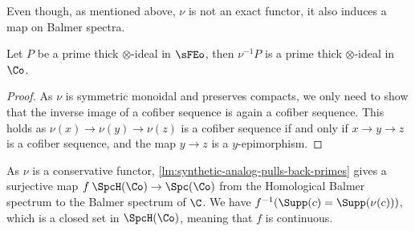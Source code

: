 Even though, as mentioned above, $\nu$ is not an exact functor, it also induces a map on Balmer spectra. 

\begin{lemma}
    \label{lm:synthetic-analog-pulls-back-primes}
    Let $P$ be a prime thick $\otimes$-ideal in $\sFEo$, then $\nu^{-1}P$ is a prime thick $\otimes$-ideal in $\Co$. 
\end{lemma}
\begin{proof}
    As $\nu$ is symmetric monoidal and preserves compacts, we only need to show that the inverse image of a cofiber sequence is again a cofiber sequence. This holds as $\nu (x)\rightarrow \nu (y)\rightarrow \nu (z)$ is a cofiber sequence if and only if $x\rightarrow y\rightarrow z$ is a cofiber sequence, and the map $y\rightarrow z$ is a $y$-epimorphism.  
\end{proof}

\begin{remark}
    As $\nu$ is a conservative functor, \cref{lm:synthetic-analog-pulls-back-primes} gives a surjective map $f\: \SpcH(\Co)\to \Spc(\Co)$ from the Homological Balmer spectrum to the Balmer spectrum of $\C$. We have $f^{-1}(\Supp(c) = \Supp(\nu (c)))$, which is a closed set in $\SpcH(\Co)$, meaning that $f$ is continuous. 
\end{remark}